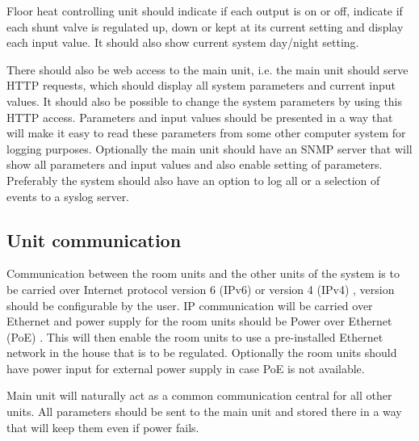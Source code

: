 Floor heat controlling unit should indicate if each output is on or
off, indicate if each shunt valve is regulated up, down or kept at its
current setting and display each input value. It should also show
current system day/night setting. 

There should also be web access to the main unit, i.e. the main unit
should serve HTTP
requests, which should display all system parameters and current input
values. It should also be possible to change the system parameters by
using this HTTP access. Parameters and input values should be
presented in a way that will make it easy to read these parameters
from some other computer system for logging purposes. Optionally the
main unit should have an SNMP
server that will show all parameters and input values and also enable
setting of parameters. Preferably the system should also have an
option to log all or a selection of events to a syslog
server.


\subsection{Unit communication}
Communication between the room units and the other units of the system
is to be carried over Internet protocol version 6 (IPv6) or version 4
(IPv4)
, version should be configurable by the user. IP communication
will be carried over Ethernet
and power supply for the room units
should be Power over Ethernet (PoE)
. This will then enable the room
units to use a pre-installed Ethernet network in the house that is to
be regulated. Optionally the room units should have power input for
external power supply in case PoE is not available.

Main unit will naturally act as a common communication central for all
other units. All parameters should be sent to the main unit and stored
there in a way that will keep them even if power fails. 
